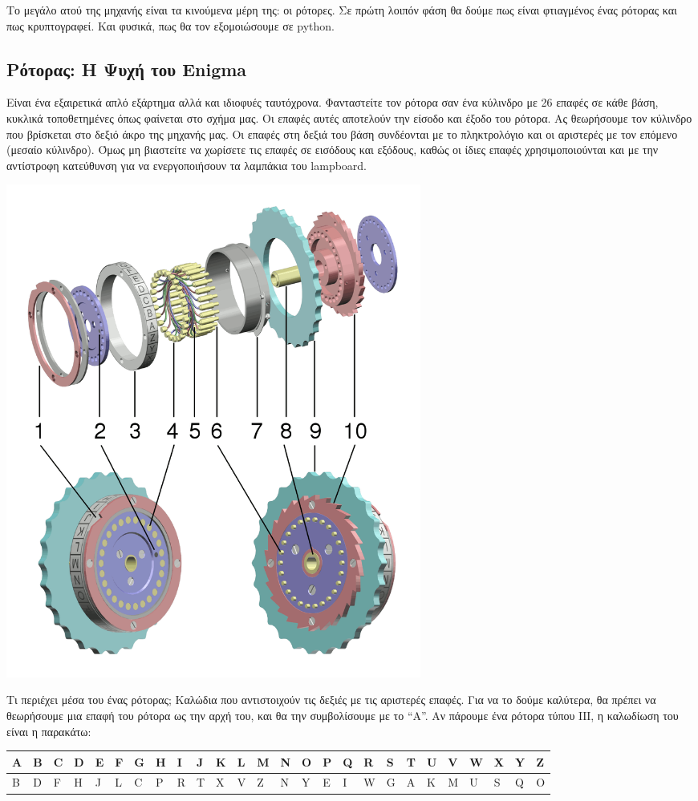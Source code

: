 \documentclass[a4paper,twoside,12pt]{article}
\begin{document}
Το μεγάλο ατού της μηχανής είναι τα κινούμενα μέρη της: οι ρότορες. Σε πρώτη λοιπόν φάση θα δούμε πως είναι φτιαγμένος ένας ρότορας και πως κρυπτογραφεί. Και φυσικά, πως θα τον εξομοιώσουμε σε python.

\subsection{Ρότορας: Η Ψυχή του Enigma}

Είναι ένα εξαιρετικά απλό εξάρτημα αλλά και ιδιοφυές ταυτόχρονα. Φανταστείτε τον ρότορα σαν ένα κύλινδρο με 26 επαφές σε κάθε βάση, κυκλικά τοποθετημένες όπως φαίνεται στο σχήμα μας. Οι επαφές αυτές αποτελούν την είσοδο και έξοδο του ρότορα. Ας θεωρήσουμε τον κύλινδρο που βρίσκεται στο δεξιό άκρο της μηχανής μας. Οι επαφές στη δεξιά του βάση συνδέονται με το πληκτρολόγιο και οι αριστερές με τον επόμενο (μεσαίο κύλινδρο).  Όμως μη βιαστείτε να χωρίσετε τις επαφές σε εισόδους και εξόδους, καθώς οι ίδιες επαφές χρησιμοποιούνται και με την αντίστροφη κατεύθυνση για να ενεργοποιήσουν τα λαμπάκια του lampboard.

\begin{center}
  \includegraphics[width=0.6\textwidth]{images/main/rotors}
\end{center}

Τι περιέχει μέσα του ένας ρότορας; Καλώδια που αντιστοιχούν τις δεξιές με τις αριστερές επαφές. Για να το δούμε καλύτερα, θα πρέπει να θεωρήσουμε μια επαφή του ρότορα ως την αρχή του, και θα την συμβολίσουμε με το “Α”. Αν πάρουμε ένα ρότορα τύπου ΙΙΙ, η καλωδίωση του είναι η παρακάτω:

\begin{center}
\begin{tabularx}{\textwidth}{|*{26}{>{\centering\arraybackslash}X|}}
\hline
A&B&C&D&E&F&G&H&I&J&K&L&M&N&O&P&Q&R&S&T&U&V&W&X&Y&Z\\
\hline
B&D&F&H&J&L&C&P&R&T&X&V&Z&N&Y&E&I&W&G&A&K&M&U&S&Q&O\\
\hline
\end{tabularx}
\end{center}
\end{document}
